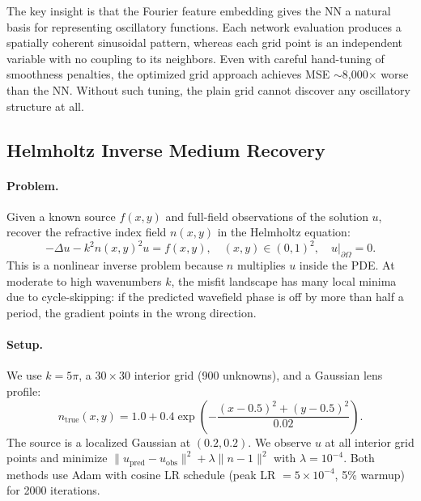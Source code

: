 \documentclass[11pt]{article}
\begin{document}
The key insight is that the Fourier feature embedding gives the NN a natural basis for representing oscillatory functions. Each network evaluation produces a spatially coherent sinusoidal pattern, whereas each grid point is an independent variable with no coupling to its neighbors. Even with careful hand-tuning of smoothness penalties, the optimized grid approach achieves MSE $\sim$8{,}000$\times$ worse than the NN. Without such tuning, the plain grid cannot discover any oscillatory structure at all.


\subsection{Helmholtz Inverse Medium Recovery}
\label{sec:helmholtz}

\paragraph{Problem.} Given a known source $f(x,y)$ and full-field observations of the solution $u$, recover the refractive index field $n(x,y)$ in the Helmholtz equation:
\begin{equation}
  -\Delta u - k^2 n(x,y)^2 u = f(x,y), \quad (x,y) \in (0,1)^2, \quad u\big|_{\partial\Omega} = 0.
  \label{eq:helmholtz}
\end{equation}
This is a nonlinear inverse problem because $n$ multiplies $u$ inside the PDE. At moderate to high wavenumbers $k$, the misfit landscape has many local minima due to cycle-skipping: if the predicted wavefield phase is off by more than half a period, the gradient points in the wrong direction.

\paragraph{Setup.} We use $k = 5\pi$, a $30 \times 30$ interior grid (900 unknowns), and a Gaussian lens profile:
\begin{equation}
  n_{\text{true}}(x,y) = 1.0 + 0.4 \exp\!\left(-\frac{(x-0.5)^2 + (y-0.5)^2}{0.02}\right).
\end{equation}
The source is a localized Gaussian at $(0.2, 0.2)$. We observe $u$ at all interior grid points and minimize $\|u_{\text{pred}} - u_{\text{obs}}\|^2 + \lambda \|n - 1\|^2$ with $\lambda = 10^{-4}$. Both methods use Adam with cosine LR schedule (peak LR $= 5 \times 10^{-4}$, 5\% warmup) for 2000 iterations.
\end{document}

